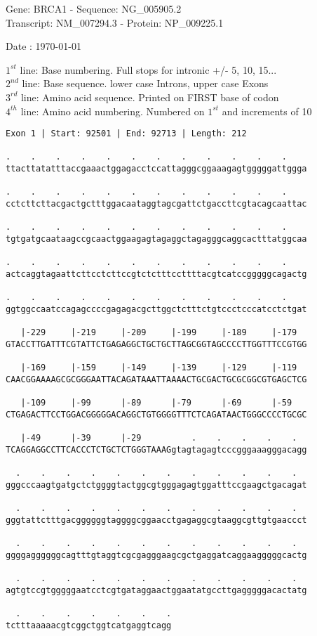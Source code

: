 \documentclass{article}
\begin{document}
\begin{center}
\begin{large}
Gene: BRCA1 - Sequence: NG\_005905.2\\
Transcript: NM\_007294.3 - Protein: NP\_009225.1
 
 Date : \today
\end{large}
\end{center}
$1^{st}$ line: Base numbering. Full stops for intronic +/- 5, 10, 15...\\
$2^{nd}$ line: Base sequence. lower case Introns, upper case Exons\\
$3^{rd}$ line: Amino acid sequence. Printed on FIRST base of codon\\
$4^{th}$ line: Amino acid numbering. Numbered on $1^{st}$ and increments of 10\\
\begin{Verbatim}
Exon 1 | Start: 92501 | End: 92713 | Length: 212
 
.    .    .    .    .    .    .    .    .    .    .    .    
ttacttatatttaccgaaactggagacctccattagggcggaaagagtgggggattggga
  
.    .    .    .    .    .    .    .    .    .    .    .    
cctcttcttacgactgctttggacaataggtagcgattctgaccttcgtacagcaattac
  
.    .    .    .    .    .    .    .    .    .    .    .    
tgtgatgcaataagccgcaactggaagagtagaggctagagggcaggcactttatggcaa
  
.    .    .    .    .    .    .    .    .    .    .    .    
actcaggtagaattcttcctcttccgtctctttccttttacgtcatccgggggcagactg
  
.    .    .    .    .    .    .    .    .    .    .    .    
ggtggccaatccagagccccgagagacgcttggctctttctgtccctcccatcctctgat
  
   |-229     |-219     |-209     |-199     |-189     |-179  
GTACCTTGATTTCGTATTCTGAGAGGCTGCTGCTTAGCGGTAGCCCCTTGGTTTCCGTGG
  
   |-169     |-159     |-149     |-139     |-129     |-119  
CAACGGAAAAGCGCGGGAATTACAGATAAATTAAAACTGCGACTGCGCGGCGTGAGCTCG
  
   |-109     |-99      |-89      |-79      |-69      |-59   
CTGAGACTTCCTGGACGGGGGACAGGCTGTGGGGTTTCTCAGATAACTGGGCCCCTGCGC
  
   |-49      |-39      |-29          .    .    .    .    .  
TCAGGAGGCCTTCACCCTCTGCTCTGGGTAAAGgtagtagagtcccgggaaagggacagg
  
  .    .    .    .    .    .    .    .    .    .    .    .  
gggcccaagtgatgctctggggtactggcgtgggagagtggatttccgaagctgacagat
  
  .    .    .    .    .    .    .    .    .    .    .    .  
gggtattctttgacggggggtaggggcggaacctgagaggcgtaaggcgttgtgaaccct
  
  .    .    .    .    .    .    .    .    .    .    .    .  
ggggaggggggcagtttgtaggtcgcgagggaagcgctgaggatcaggaagggggcactg
  
  .    .    .    .    .    .    .    .    .    .    .    .  
agtgtccgtgggggaatcctcgtgataggaactggaatatgccttgagggggacactatg
  
  .    .    .    .    .    .    .
tctttaaaaacgtcggctggtcatgaggtcagg
\end{Verbatim}
\end{document}
